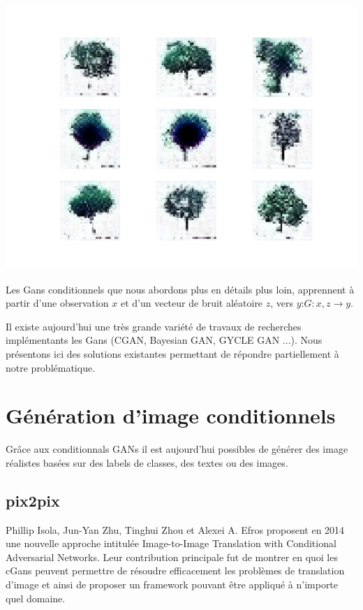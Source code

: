 \documentclass[a4paper, 12pt]{book}
\begin{document}
\begin{center}
\includegraphics[scale=0.7]{images/tests_cgan.png}
\label{fig1}
\end{center}

Les Gans conditionnels que nous abordons plus en détails plus loin, apprennent à partir d'une observation $x$ et d’un vecteur de bruit aléatoire $z$, vers $y$:$G:{x,z} →y$.

Il existe aujourd'hui une très grande variété de travaux de recherches implémentants les Gans (CGAN, Bayesian GAN, GYCLE GAN ...). Nous présentons ici des solutions existantes permettant de répondre partiellement à notre problématique.


\section{Génération d'image conditionnels}

Grâce aux conditionnals GANs il est aujourd'hui  possibles de générer des image réalistes basées sur des labels de classes, des textes ou des images.


\subsection{pix2pix}
Phillip Isola, Jun-Yan Zhu, Tinghui Zhou et Alexei A. Efros proposent en 2014 une nouvelle approche intitulée Image-to-Image Translation with Conditional Adversarial Networks.\cite{DBLP:journals/corr/GatysEB15a}
Leur contribution principale fut de montrer en quoi les cGans peuvent permettre de résoudre efficacement les problèmes de translation d'image et ainsi de proposer un framework pouvant être appliqué à n'importe quel domaine.
\end{document}
